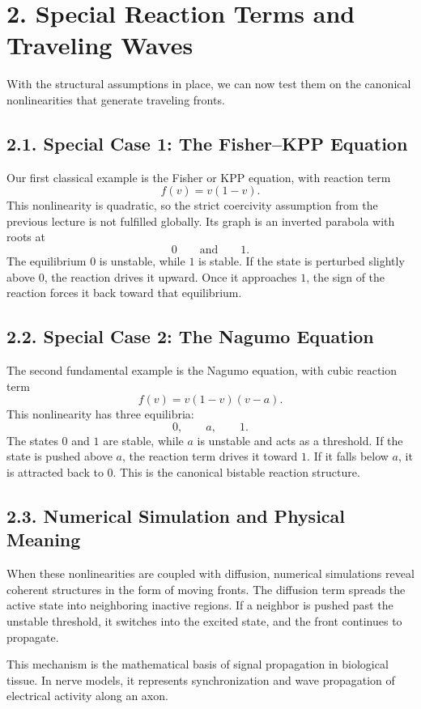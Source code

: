 \documentclass[11pt]{article}
\theoremstyle{definition}
\theoremstyle{remark}
\begin{document}
\section*{2. Special Reaction Terms and Traveling Waves}
With the structural assumptions in place, we can now test them on the canonical nonlinearities that generate traveling fronts.

\subsection*{2.1. Special Case 1: The Fisher--KPP Equation}
Our first classical example is the Fisher or KPP equation, with reaction term
\[
f(v)=v(1-v).
\]
This nonlinearity is quadratic, so the strict coercivity assumption from the previous lecture is not fulfilled globally. Its graph is an inverted parabola with roots at
\[
0\qquad\text{and}\qquad 1.
\]
The equilibrium \(0\) is unstable, while \(1\) is stable. If the state is perturbed slightly above \(0\), the reaction drives it upward. Once it approaches \(1\), the sign of the reaction forces it back toward that equilibrium.

\subsection*{2.2. Special Case 2: The Nagumo Equation}
The second fundamental example is the Nagumo equation, with cubic reaction term
\[
f(v)=v(1-v)(v-a).
\]
This nonlinearity has three equilibria:
\[
0,\qquad a,\qquad 1.
\]
The states \(0\) and \(1\) are stable, while \(a\) is unstable and acts as a threshold. If the state is pushed above \(a\), the reaction term drives it toward \(1\). If it falls below \(a\), it is attracted back to \(0\). This is the canonical bistable reaction structure.

\subsection*{2.3. Numerical Simulation and Physical Meaning}
When these nonlinearities are coupled with diffusion, numerical simulations reveal coherent structures in the form of moving fronts. The diffusion term spreads the active state into neighboring inactive regions. If a neighbor is pushed past the unstable threshold, it switches into the excited state, and the front continues to propagate.

This mechanism is the mathematical basis of signal propagation in biological tissue. In nerve models, it represents synchronization and wave propagation of electrical activity along an axon.
\end{document}
